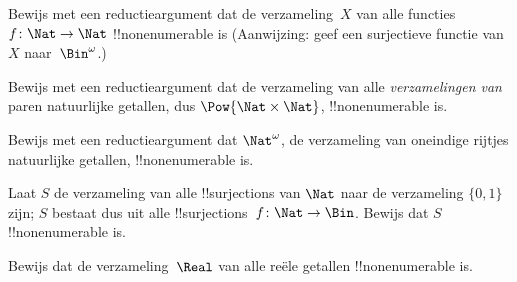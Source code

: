 \documentclass[../../../include/open-logic-section]{subfiles}
\begin{document}
\begin{prob}\label{sfr:siz:red:prob:nat-nat}
  Bewijs met een reductieargument dat de verzameling~$X$ van alle
  functies $f\colon \Nat \to \Nat$ !!{nonenumerable} is (Aanwijzing: geef
  een surjectieve functie van $X$ naar~$\Bin^\omega$.)
\end{prob}

\begin{prob}
Bewijs met een reductieargument dat de verzameling van alle
\emph{verzamelingen van} paren natuurlijke getallen, dus
$\Pow{\Nat \times \Nat}$, !!{nonenumerable} is.
\end{prob}

\begin{prob}
Bewijs met een reductieargument dat $\Nat^\omega$, de verzameling van
oneindige rijtjes natuurlijke getallen, !!{nonenumerable} is.
\end{prob}


\begin{prob}
Laat $S$ de verzameling van alle !!{surjection}s van $\Nat$ naar de
verzameling $\{0,1\}$ zijn; $S$ bestaat dus uit alle
!!{surjection}s~$f \colon \Nat \to \Bin$. Bewijs dat $S$
!!{nonenumerable} is.
\end{prob}

\begin{prob}
Bewijs dat de verzameling~$\Real$ van alle reële getallen
!!{nonenumerable} is.
\end{prob}
\end{document}
